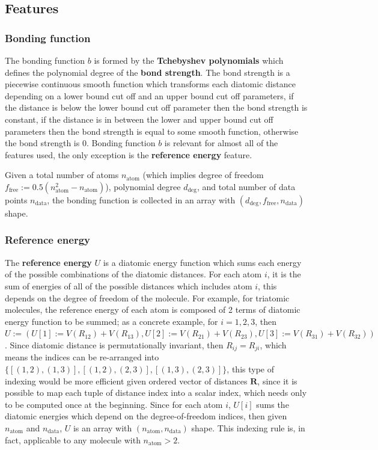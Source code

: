 \documentclass[12pt]{article}
\begin{document}
\subsection{Features}
\subsubsection{Bonding function}
\label{subsub:bondingfunction}
The bonding function $b$ is formed by the \textbf{Tchebyshev polynomials} which defines the polynomial degree of the \textbf{bond strength}. The bond strength is a piecewise continuous smooth function which transforms each diatomic distance depending on a lower bound cut off and an upper bound cut off parameters, if the distance is below the lower bound cut off parameter then the bond strength is constant, if the distance is in between the lower and upper bound cut off parameters then the bond strength is equal to some smooth function, otherwise the bond strength is $0$. Bonding function $b$ is relevant for almost all of the features used, the only exception is the \textbf{reference energy} feature.

Given a total number of atoms $n_{\text{atom}}$ (which implies degree of freedom $f_{\text{free}} := 0.5(n_{\text{atom}}^2 - n_{\text{atom}})$), polynomial degree $d_{\text{deg}}$, and total number of data points $n_{\text{data}}$, the bonding function is collected in an array with $(d_{\text{deg}}, f_{\text{free}}, n_{\text{data}})$ shape.

\subsubsection{Reference energy}
\label{subsub:referencenergy}
The \textbf{reference energy} $U$ is a diatomic energy function which sums each energy of the possible combinations of the diatomic distances. For each atom $i$, it is the sum of energies of all of the possible distances which includes atom $i$, this depends on the degree of freedom of the molecule. For example, for triatomic molecules, the reference energy of each atom is composed of 2 terms of diatomic energy function to be summed; as a concrete example, for $i=1,2,3$, then $U := ( U[1] := V(R_{12}) + V(R_{13}), U[2] := V(R_{21}) + V(R_{23}), U[3] := V(R_{31}) + V(R_{32}) )$. Since diatomic distance is permutationally invariant, then $R_{ij} = R_{ji}$, which means the indices can be re-arranged into $\{[(1,2), (1,3)], 
[(1,2), (2,3)],
[(1,3), (2,3)]\}$, this type of indexing would be more efficient given ordered vector of distances $\mathbf{R}$, since it is possible to map each tuple of distance index into a scalar index, which needs only to be computed once at the beginning. Since for each atom $i$, $U[i]$ sums the diatomic energies which depend on the degree-of-freedom indices, then given $n_{\text{atom}}$ and $n_{\text{data}}$, $U$ is an array with $(n_{\text{atom}}, n_{\text{data}})$ shape. This indexing rule is, in fact, applicable to any molecule with $n_{\text{atom}} > 2$. 
\end{document}
